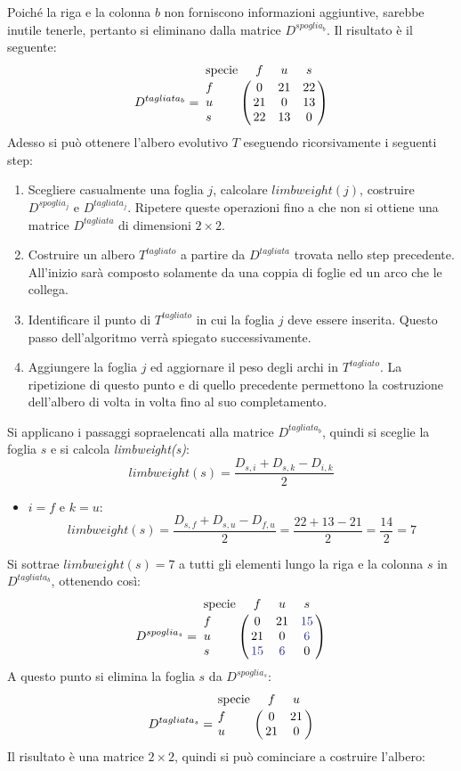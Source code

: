 Poiché la riga e la colonna $b$ non forniscono informazioni aggiuntive, sarebbe inutile tenerle, pertanto si eliminano dalla matrice $D^{spoglia_{b}}$. Il risultato è il seguente:
\[
D^{tagliata_{b}}= \bordermatrix{\text{specie}&f&u&s\cr
                f& 0 & 21 & 22\cr
                u& 21 & 0 & 13\cr
                s& 22 & 13 & 0}
\]
Adesso si può ottenere l'albero evolutivo $T$ eseguendo ricorsivamente i seguenti step:
\begin{enumerate}
	\item Scegliere casualmente una foglia $j$, calcolare $limbweight(j)$, costruire $D^{spoglia_{j}}$ e  $D^{tagliata_{j}}$. Ripetere queste operazioni fino a che non si ottiene una matrice $D^{tagliata}$ di dimensioni $2 \times 2$.
	\item Costruire un albero $T^{tagliato}$ a partire da $D^{tagliata}$ trovata nello step precedente. All'inizio sarà composto solamente da una coppia di foglie ed un arco che le collega.
	\item Identificare il punto di $T^{tagliato}$ in cui la foglia $j$ deve essere inserita. Questo passo dell'algoritmo verrà spiegato successivamente.
	\item Aggiungere la foglia $j$ ed aggiornare il peso degli archi in $T^{tagliato}$. La ripetizione di questo punto e di quello precedente permettono la costruzione dell'albero di volta in volta fino al suo completamento.
\end{enumerate}
Si applicano i passaggi sopraelencati alla matrice $D^{tagliata_{b}}$, quindi si sceglie la foglia $s$ e si calcola \textit{limbweight(s)}:
\[limbweight(s)=\frac{D_{s,i}+D_{s,k}-D_{i,k}}{2}\]
\begin{itemize}
	\item $i=f$ e $k=u$:
	\[limbweight(s)=\frac{D_{s,f}+D_{s,u}-D_{f,u}}{2}=\frac{22+13-21}{2}=\frac{14}{2}=7\]
\end{itemize}
Si sottrae $limbweight(s)=7$ a tutti gli elementi lungo la riga e la colonna $s$ in $D^{tagliata_{b}}$, ottenendo così:
\[
D^{spoglia_{s}}= \bordermatrix{\text{specie}&f&u&s\cr
                f& 0 & 21 & {\color{Blue} 15}\cr
                u& 21 & 0 & {\color{Blue} 6}\cr
                s& {\color{Blue} 15} & {\color{Blue} 6} & 0}
\]
A questo punto si elimina la foglia $s$ da $D^{spoglia_{s}}$:
\[
D^{tagliata_{s}}= \bordermatrix{\text{specie}&f&u\cr
                f& 0 & 21\cr
                u& 21 & 0}
\]
Il risultato è una matrice $2 \times 2$, quindi si può cominciare a costruire l'albero:
